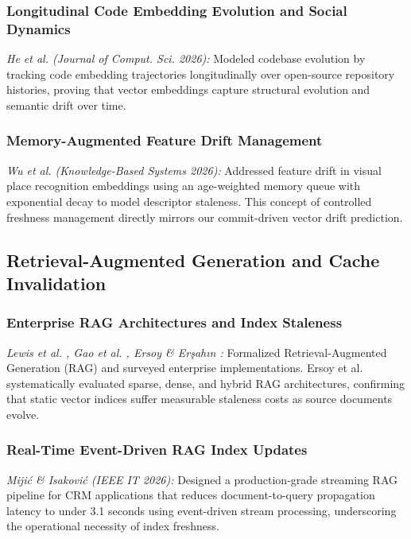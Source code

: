 \documentclass[conference]{IEEEtran}
\begin{document}
\subsubsection{Longitudinal Code Embedding Evolution and Social Dynamics}
\emph{He et al. \cite{Yulong2026} (Journal of Comput. Sci. 2026):} Modeled codebase evolution by tracking code embedding trajectories longitudinally over open-source repository histories, proving that vector embeddings capture structural evolution and semantic drift over time.

\subsubsection{Memory-Augmented Feature Drift Management}
\emph{Wu et al. \cite{Qilong2026} (Knowledge-Based Systems 2026):} Addressed feature drift in visual place recognition embeddings using an age-weighted memory queue with exponential decay to model descriptor staleness. This concept of controlled freshness management directly mirrors our commit-driven vector drift prediction.

\subsection{Retrieval-Augmented Generation and Cache Invalidation}

\subsubsection{Enterprise RAG Architectures and Index Staleness}
\emph{Lewis et al. \cite{lewis2020retrieval}, Gao et al. \cite{gao2023retrieval}, Ersoy \& Er{\c{s}}ah{\i}n \cite{Ersoy2025}:} Formalized Retrieval-Augmented Generation (RAG) and surveyed enterprise implementations. Ersoy et al. systematically evaluated sparse, dense, and hybrid RAG architectures, confirming that static vector indices suffer measurable staleness costs as source documents evolve.

\subsubsection{Real-Time Event-Driven RAG Index Updates}
\emph{Miji{\'c} \& Isakovi{\'c} \cite{Mijic2026} (IEEE IT 2026):} Designed a production-grade streaming RAG pipeline for CRM applications that reduces document-to-query propagation latency to under 3.1 seconds using event-driven stream processing, underscoring the operational necessity of index freshness.
\end{document}
